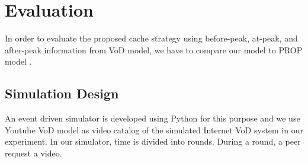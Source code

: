 \documentclass[10pt,final,journal,a4paper]{IEEEtran}
\begin{document}
\section{Evaluation}\label{evaluation}
In order to evaluate the proposed cache strategy using before-peak, at-peak, and after-peak information from VoD model, we have to compare our model to PROP model \cite{1613869}.

\subsection{Simulation Design}\label{simulationdesign}
An event driven simulator is developed using Python for this purpose and we use Youtube VoD model as video catalog of the simulated Internet VoD system in our experiment.
In our simulator, time is divided into rounds. 
During a round, a peer request a video.
\end{document}

